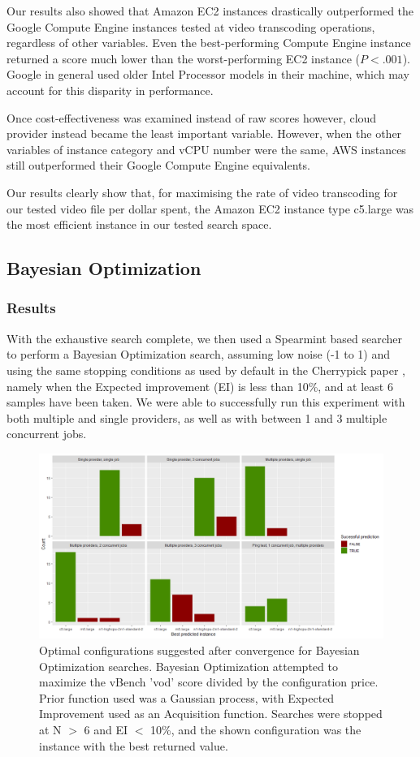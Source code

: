 \documentclass{report}
\begin{document}
Our results also showed that Amazon EC2 instances drastically outperformed the Google Compute Engine instances tested at video transcoding operations, regardless of other variables. Even the best-performing Compute Engine instance returned a score much lower than the worst-performing EC2 instance ($P < .001$). Google in general used older Intel Processor models in their machine, which may account for this disparity in performance.

Once cost-effectiveness was examined instead of raw scores however, cloud provider instead became the least important variable. However, when the other variables of instance category and vCPU number were the same, AWS instances still outperformed their Google Compute Engine equivalents.

Our results clearly show that, for maximising the rate of video transcoding for our tested video file per dollar spent, the Amazon EC2 instance type c5.large was the most efficient instance in our tested search space. 
\subsection{Bayesian Optimization}
\subsubsection{Results}
With the exhaustive search complete, we then used a Spearmint based searcher to perform a Bayesian Optimization search, assuming low noise (-1 to 1) and using the same stopping conditions as used by default in the Cherrypick paper \cite{Alipourfard2017}, namely when the Expected improvement (EI) is less than 10\%, and at least 6 samples have been taken. We were able to successfully run this experiment with both multiple and single providers, as well as with between 1 and 3 multiple concurrent jobs.

\begin{figure}
  \caption{Optimal configurations suggested after convergence for Bayesian Optimization searches. Bayesian Optimization attempted to maximize the vBench 'vod' score divided by the configuration price. Prior function used was a Gaussian process, with Expected Improvement used as an Acquisition function. Searches were stopped at N $>$ 6 and EI $<$ 10\%, and the shown configuration was the instance with the best returned value.}
  \label{fig:bo-results}
  \centering
  \includegraphics[scale=0.5]{bo_results}
\end{figure}
\end{document}
